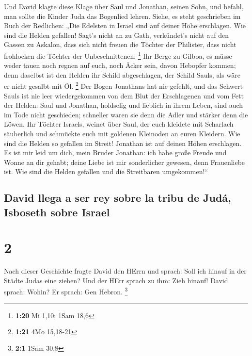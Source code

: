  Und David klagte diese Klage über Saul und Jonathan,
seinen Sohn,  und befahl, man sollte die Kinder Juda das
Bogenlied lehren. Siehe, es steht geschrieben im Buch der Redlichen:
 „Die Edelsten in Israel sind auf deiner Höhe erschlagen.
Wie sind die Helden gefallen!  Sagt's nicht an zu Gath,
verkündet's nicht auf den Gassen zu Askalon, dass sich nicht freuen die
Töchter der Philister, dass nicht frohlocken die Töchter der
Unbeschnittenen. \footnote{\textbf{1:20} Mi 1,10; 1Sam 18,6}
 Ihr Berge zu Gilboa, es müsse weder tauen noch regnen
auf euch, noch Äcker sein, davon Hebopfer kommen; denn daselbst ist den
Helden ihr Schild abgeschlagen, der Schild Sauls, als wäre er nicht
gesalbt mit Öl. \footnote{\textbf{1:21} 4Mo 15,18-21} 
Der Bogen Jonathans hat nie gefehlt, und das Schwert Sauls ist nie leer
wiedergekommen von dem Blut der Erschlagenen und vom Fett der Helden.
 Saul und Jonathan, holdselig und lieblich in ihrem
Leben, sind auch im Tode nicht geschieden; schneller waren sie denn die
Adler und stärker denn die Löwen.  Ihr Töchter Israels,
weinet über Saul, der euch kleidete mit Scharlach säuberlich und
schmückte euch mit goldenen Kleinoden an euren Kleidern. 
Wie sind die Helden so gefallen im Streit! Jonathan ist auf deinen Höhen
erschlagen.  Es ist mir leid um dich, mein Bruder
Jonathan: ich habe große Freude und Wonne an dir gehabt; deine Liebe ist
mir sonderlicher gewesen, denn Frauenliebe ist.  Wie sind
die Helden gefallen und die Streitbaren umgekommen!{}``

\hypertarget{david-llega-a-ser-rey-sobre-la-tribu-de-juduxe1-isboseth-sobre-israel}{%
\subsection{David llega a ser rey sobre la tribu de Judá, Isboseth sobre
Israel}\label{david-llega-a-ser-rey-sobre-la-tribu-de-juduxe1-isboseth-sobre-israel}}

\hypertarget{section-1}{%
\section{2}\label{section-1}}

 Nach dieser Geschichte fragte David den HErrn und sprach:
Soll ich hinauf in der Städte Judas eine ziehen? Und der HErr sprach zu
ihm: Zieh hinauf! David sprach: Wohin? Er sprach: Gen Hebron.
\footnote{\textbf{2:1} 1Sam 30,8}

